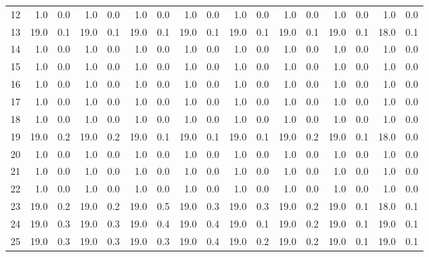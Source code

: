 \begin{tabular}{lrrrrrrrrrrrrrrrr}
     12 &   1.0 &   0.0 &   1.0 &     0.0 &   1.0 &     0.0 &   1.0 &     0.0 &   1.0 &     0.0 &   1.0 &     0.0 &   1.0 &     0.0 &   1.0 &     0.0 \\
     13 &  19.0 &   0.1 &  19.0 &     0.1 &  19.0 &     0.1 &  19.0 &     0.1 &  19.0 &     0.1 &  19.0 &     0.1 &  19.0 &     0.1 &  18.0 &     0.1 \\
     14 &   1.0 &   0.0 &   1.0 &     0.0 &   1.0 &     0.0 &   1.0 &     0.0 &   1.0 &     0.0 &   1.0 &     0.0 &   1.0 &     0.0 &   1.0 &     0.0 \\
     15 &   1.0 &   0.0 &   1.0 &     0.0 &   1.0 &     0.0 &   1.0 &     0.0 &   1.0 &     0.0 &   1.0 &     0.0 &   1.0 &     0.0 &   1.0 &     0.0 \\
     16 &   1.0 &   0.0 &   1.0 &     0.0 &   1.0 &     0.0 &   1.0 &     0.0 &   1.0 &     0.0 &   1.0 &     0.0 &   1.0 &     0.0 &   1.0 &     0.0 \\
     17 &   1.0 &   0.0 &   1.0 &     0.0 &   1.0 &     0.0 &   1.0 &     0.0 &   1.0 &     0.0 &   1.0 &     0.0 &   1.0 &     0.0 &   1.0 &     0.0 \\
     18 &   1.0 &   0.0 &   1.0 &     0.0 &   1.0 &     0.0 &   1.0 &     0.0 &   1.0 &     0.0 &   1.0 &     0.0 &   1.0 &     0.0 &   1.0 &     0.0 \\
     19 &  19.0 &   0.2 &  19.0 &     0.2 &  19.0 &     0.1 &  19.0 &     0.1 &  19.0 &     0.1 &  19.0 &     0.2 &  19.0 &     0.1 &  18.0 &     0.0 \\
     20 &   1.0 &   0.0 &   1.0 &     0.0 &   1.0 &     0.0 &   1.0 &     0.0 &   1.0 &     0.0 &   1.0 &     0.0 &   1.0 &     0.0 &   1.0 &     0.0 \\
     21 &   1.0 &   0.0 &   1.0 &     0.0 &   1.0 &     0.0 &   1.0 &     0.0 &   1.0 &     0.0 &   1.0 &     0.0 &   1.0 &     0.0 &   1.0 &     0.0 \\
     22 &   1.0 &   0.0 &   1.0 &     0.0 &   1.0 &     0.0 &   1.0 &     0.0 &   1.0 &     0.0 &   1.0 &     0.0 &   1.0 &     0.0 &   1.0 &     0.0 \\
     23 &  19.0 &   0.2 &  19.0 &     0.2 &  19.0 &     0.5 &  19.0 &     0.3 &  19.0 &     0.3 &  19.0 &     0.2 &  19.0 &     0.1 &  18.0 &     0.1 \\
     24 &  19.0 &   0.3 &  19.0 &     0.3 &  19.0 &     0.4 &  19.0 &     0.4 &  19.0 &     0.1 &  19.0 &     0.2 &  19.0 &     0.1 &  19.0 &     0.1 \\
     25 &  19.0 &   0.3 &  19.0 &     0.3 &  19.0 &     0.3 &  19.0 &     0.4 &  19.0 &     0.2 &  19.0 &     0.2 &  19.0 &     0.1 &  19.0 &     0.1 \\

\end{tabular}
